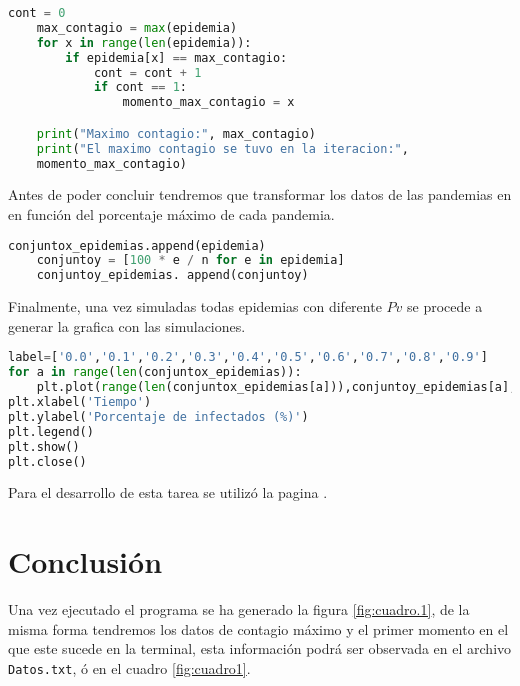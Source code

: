\documentclass{article}
\begin{document}
\begin{lstlisting}[language=Python]
    cont = 0
    max_contagio = max(epidemia)
    for x in range(len(epidemia)):
        if epidemia[x] == max_contagio:
            cont = cont + 1
            if cont == 1:
                momento_max_contagio = x

    print("Maximo contagio:", max_contagio)
    print("El maximo contagio se tuvo en la iteracion:", 
    momento_max_contagio)
 \end{lstlisting}

Antes de poder concluir tendremos que transformar los datos de las pandemias en en función del porcentaje máximo de cada pandemia.

\begin{lstlisting}[language=Python]
    conjuntox_epidemias.append(epidemia)
    conjuntoy = [100 * e / n for e in epidemia]
    conjuntoy_epidemias. append(conjuntoy)
 \end{lstlisting}

Finalmente, una vez simuladas todas epidemias con diferente $Pv$ se procede a generar la grafica con las simulaciones.\\

\begin{lstlisting}[language=Python]
label=['0.0','0.1','0.2','0.3','0.4','0.5','0.6','0.7','0.8','0.9']
for a in range(len(conjuntox_epidemias)):
    plt.plot(range(len(conjuntox_epidemias[a])),conjuntoy_epidemias[a], label=label[a])
plt.xlabel('Tiempo')
plt.ylabel('Porcentaje de infectados (%)')
plt.legend()
plt.show()
plt.close()
 \end{lstlisting}

Para el desarrollo de esta tarea se utilizó la pagina \citep{DRA.Code}.


\section{Conclusión}

Una vez ejecutado el programa se ha generado la figura \ref{fig:cuadro.1}, de la misma forma tendremos los datos  de contagio máximo y el primer momento en el que este sucede en la terminal, esta información podrá ser observada en el archivo \texttt{Datos.txt}, ó  en el cuadro \ref{fig:cuadro1}.
\end{document}
